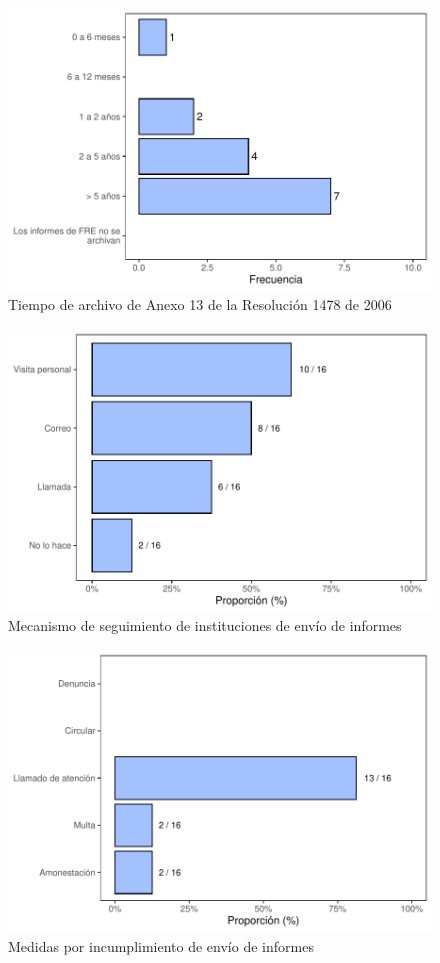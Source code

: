 \documentclass[
]{book}
\begin{document}
\begin{figure}
\includegraphics[width=0.85\linewidth]{InformeFinal_files/figure-latex/ArchivoInformesFRE-1} \caption{Tiempo de archivo de Anexo 13 de la Resolución 1478 de 2006}\label{fig:ArchivoInformesFRE}
\end{figure}
\begin{figure}
\includegraphics[width=0.85\linewidth]{InformeFinal_files/figure-latex/SeguimientoEnvioInformes-1} \caption{Mecanismo de seguimiento de instituciones de envío de informes}\label{fig:SeguimientoEnvioInformes}
\end{figure}
\begin{figure}
\includegraphics[width=0.85\linewidth]{InformeFinal_files/figure-latex/IncumplimientoEnvioInformes-1} \caption{Medidas por incumplimiento de envío de informes}\label{fig:IncumplimientoEnvioInformes}
\end{figure}
\end{document}
